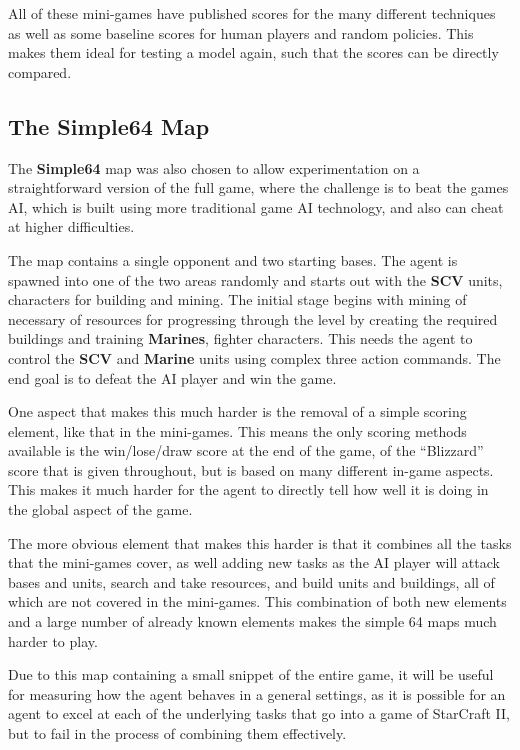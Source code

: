 All of these mini-games have published scores for the many different
techniques as well as some baseline scores for human players and random
policies. This makes them ideal for testing a model again, such that the scores can
be directly compared.

\subsection{The \textbf{Simple64} Map}

The \textbf{Simple64} map was also chosen to allow experimentation on a
straightforward version of the full game, where the challenge is to beat the
games AI, which is built using more traditional game AI technology, and also can
cheat at higher difficulties.

The map contains a single opponent and two starting bases. The agent is spawned
into one of the two areas randomly and starts out with the \textbf{SCV} units,
characters for building and mining. The initial stage begins with mining of
necessary of resources for progressing through the level by creating the
required buildings and training \textbf{Marines}, fighter characters. This needs
the agent to control the \textbf{SCV} and \textbf{Marine} units using complex
three action commands. The end goal is to defeat the AI player and win the game.

One aspect that makes this much harder is the removal of a simple scoring
element, like that in the mini-games. This means the only scoring methods
available is the win/lose/draw score at the end of the game, of the ``Blizzard''
score that is given throughout, but is based on many different in-game aspects.
This makes it much harder for the agent to directly tell how well it is doing in
the global aspect of the game.

The more obvious element that makes this harder is that it combines all the
tasks that the mini-games cover, as well adding new tasks as the AI player will
attack bases and units, search and take resources, and build units and
buildings, all of which are not covered in the mini-games. This combination of
both new elements and a large number of already known elements makes the simple
64 maps much harder to play.

Due to this map containing a small snippet of the entire game, it will be useful
for measuring how the agent behaves in a general settings, as it is possible for
an agent to excel at each of the underlying tasks that go into a game of
StarCraft II, but to fail in the process of combining them effectively.

